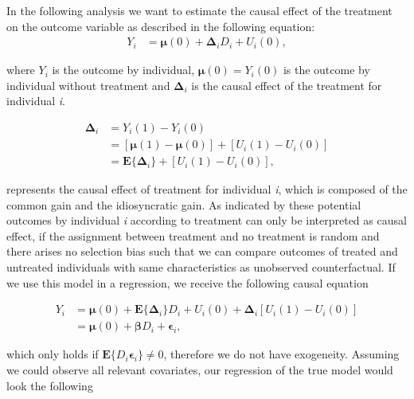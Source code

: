 In the following analysis we want to estimate the causal effect of the treatment on the outcome variable as described in the following equation: 
\begin{align}
	\label{eq:eq1}
	\textit{Y}_i &= \boldsymbol{\mu}(0) + \boldsymbol{\Delta}_i \textit{D}_i + \textit{U}_i(0),
\end{align}

where $\textit{Y}_i$ is the outcome by individual, $\boldsymbol{\mu}(0) = \textit{Y}_i(0)$ is the outcome by individual without treatment and $\boldsymbol{\Delta}_i$ is the causal effect of the treatment  for individual \textit{i}.

\begin{equation}
  \begin{aligned}
	\label{eq:eq2}
	\boldsymbol{\Delta}_i &= \textit{Y}_i(1) - \textit{Y}_i(0) \\
						 &= [\boldsymbol{\mu}(1)- \boldsymbol{\mu}(0)] + [\textit{U}_i(1)-\textit{U}_i(0)] \\
						 &= \boldsymbol{E} \{ \boldsymbol{\Delta}_i \} + [\textit{U}_i(1)-\textit{U}_i(0)],
  \end{aligned}
\end{equation}
  

represents the causal effect of treatment for individual \textit{i}, which is composed of the common gain and the idiosyncratic gain. As indicated by \cite{imbens2015causal} these potential outcomes by individual \textit{i} according to treatment can only be interpreted as causal effect, if the assignment between treatment and no treatment is random and there arises no selection bias such that we can compare outcomes of treated and untreated individuals with same characteristics as unobserved counterfactual. If we use this model in a regression, we receive the following causal equation

\begin{equation}
  \begin{aligned}
	\label{eq:eq3}
	\textit{Y}_i &= \boldsymbol{\mu}(0) + \boldsymbol{E} \{ \boldsymbol{\Delta}_i \} \textit{D}_i + \textit{U}_i(0) + \boldsymbol{\Delta}_i[\textit{U}_i(1)-\textit{U}_i(0)] \\
				 &= \boldsymbol{\mu}(0) + \boldsymbol{\beta} \textit{D}_i + \boldsymbol{\epsilon}_i,
  \end{aligned}
\end{equation}
  
which only holds if $\boldsymbol{E}\{\textit{D}_i\boldsymbol{\epsilon}_i\} \neq 0$, therefore we do not have exogeneity. Assuming we could observe all relevant covariates, our regression of the true model would look the following

